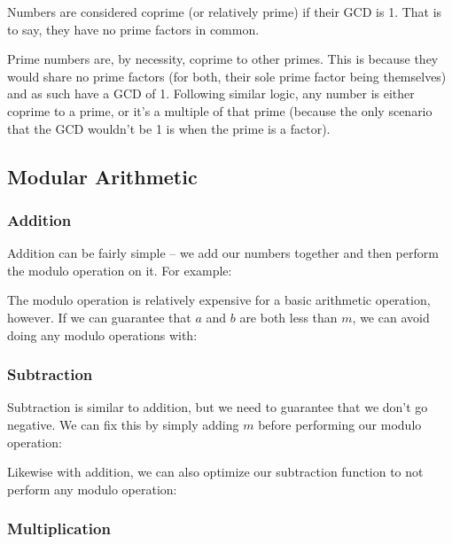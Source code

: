 Numbers are considered coprime (or relatively prime) if their GCD is 1. That is to say, they have no prime factors in common.

Prime numbers are, by necessity, coprime to other primes. This is because they would share no prime factors (for both, their sole prime factor being themselves) and as such have a GCD of 1. Following similar logic, any number is either coprime to a prime, or it's a multiple of that prime (because the only scenario that the GCD wouldn't be 1 is when the prime is a factor).

\subsection{Modular Arithmetic}

\subsubsection{Addition}

Addition can be fairly simple -- we add our numbers together and then perform the modulo operation on it. For example:


The modulo operation is relatively expensive for a basic arithmetic operation, however. If we can guarantee that $a$ and $b$ are both less than $m$, we can avoid doing any modulo operations with:


\subsubsection{Subtraction}

Subtraction is similar to addition, but we need to guarantee that we don't go negative. We can fix this by simply adding $m$ before performing our modulo operation:


Likewise with addition, we can also optimize our subtraction function to not perform any modulo operation:


\subsubsection{Multiplication}

